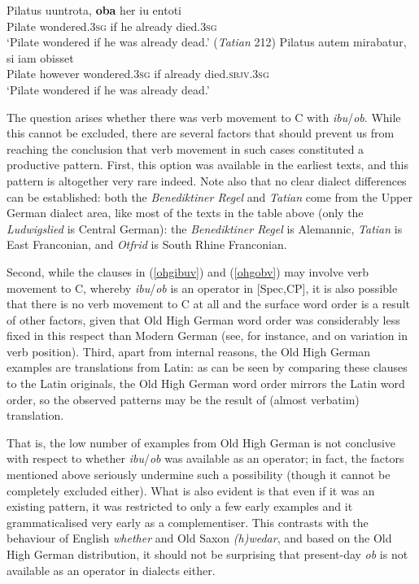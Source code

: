 \ea
\ea \gll Pilatus uuntrota, \textbf{oba} her iu entoti \label{pilatus}\\
Pilate wondered.\textsc{3sg} if he already died.\textsc{3sg}\\
\glt `Pilate wondered if he was already dead.' (\textit{Tatian} 212)
\ex \gll Pilatus autem mirabatur, si iam obisset\\
Pilate however wondered.\textsc{3sg} if already died.\textsc{sbjv.3sg}\\
\glt `Pilate wondered if he was already dead.'
\z
\z

The question arises whether there was verb movement to C with \textit{ibu}/\textit{ob}. While this cannot be excluded, there are several factors that should prevent us from reaching the conclusion that verb movement in such cases constituted a productive pattern. First, this option was available in the earliest texts, and this pattern is altogether very rare indeed. Note also that no clear dialect differences can be established: both the \textit{Benediktiner Regel} and \textit{Tatian} come from the Upper German dialect area, like most of the texts in the table above (only the \textit{Ludwigslied} is Central German): the \textit{Benediktiner Regel} is Alemannic, \textit{Tatian} is East Franconian, and \textit{Otfrid} is South Rhine Franconian.

Second, while the clauses in (\ref{ohgibuv}) and (\ref{ohgobv}) may involve verb movement to C, whereby \textit{ibu}/\textit{ob} is an operator in [Spec,CP], it is also possible that there is no verb movement to C at all and the surface word order is a result of other factors, given that Old High German word order was considerably less fixed in this respect than Modern German (see, for instance, \citealt{hinterhoelzlpetrova2010} and \citealt{conigliolinderuette2017} on variation in verb position). Third, apart from internal reasons, the Old High German examples are translations from Latin: as can be seen by comparing these clauses to the Latin originals, the Old High German word order mirrors the Latin word order, so the observed patterns may be the result of (almost verbatim) translation. 

That is, the low number of examples from Old High German is not conclusive with respect to whether \textit{ibu}/\textit{ob} was available as an operator; in fact, the factors mentioned above seriously undermine such a possibility (though it cannot be completely excluded either). What is also evident is that even if it was an existing pattern, it was restricted to only a few early examples and it grammaticalised very early as a complementiser. This contrasts with the behaviour of English \textit{whether} and Old Saxon \textit{(h)wedar}, and based on the Old High German distribution, it should not be surprising that present-day \textit{ob} is not available as an operator in dialects either.

